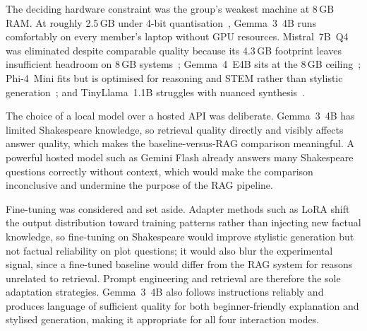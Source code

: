 The deciding hardware constraint was the group's weakest machine at
8\,GB RAM. At roughly 2.5\,GB under 4-bit
quantisation~\cite{google_gemma3_qat}, Gemma~3~4B runs comfortably on
every member's laptop without GPU resources. Mistral~7B~Q4 was eliminated
despite comparable quality because its 4.3\,GB footprint leaves
insufficient headroom on 8\,GB systems~\cite{mistral_vram}; Gemma~4~E4B
sits at the 8\,GB ceiling~\cite{google_gemma4}; Phi-4~Mini fits but is
optimised for reasoning and STEM rather than stylistic
generation~\cite{phi4_mini_benchmark}; and TinyLlama~1.1B struggles with
nuanced synthesis~\cite{tinyllama_eval}.

The choice of a local model over a hosted API was deliberate. Gemma~3~4B
has limited Shakespeare knowledge, so retrieval quality directly and
visibly affects answer quality, which makes the baseline-versus-RAG
comparison meaningful. A powerful hosted model such as Gemini Flash
already answers many Shakespeare questions correctly without context,
which would make the comparison inconclusive and undermine the purpose of
the RAG pipeline.

Fine-tuning was considered and set aside. Adapter methods such as LoRA
shift the output distribution toward training patterns rather than
injecting new factual knowledge, so fine-tuning on Shakespeare would
improve stylistic generation but not factual reliability on plot
questions; it would also blur the experimental signal, since a fine-tuned
baseline would differ from the RAG system for reasons unrelated to
retrieval. Prompt engineering and retrieval are therefore the sole
adaptation strategies. Gemma~3~4B also follows instructions reliably and
produces language of sufficient quality for both beginner-friendly
explanation and stylised generation, making it appropriate for all four
interaction modes.
